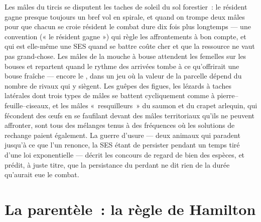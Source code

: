 \begin{example}\label{ex:b3:behavioural-ecology:games}
Les mâles du tircis se disputent les taches de soleil du sol
forestier~: le résident gagne presque toujours un bref vol en spirale,
et quand on trompe deux mâles pour que chacun se croie résident le
combat dure dix fois plus longtemps --- une convention (« le résident
gagne ») qui règle les affrontements à bon compte, et qui est elle-même
une SES quand se battre coûte cher et que la ressource ne vaut pas
grand-chose. Les mâles de la mouche à bouse attendent les femelles sur
les bouses et repartent quand le rythme des arrivées tombe à ce
qu'offrirait une bouse fraîche --- encore le , dans un jeu où la valeur de la parcelle dépend du nombre de
rivaux qui y siègent. Les guêpes des figues, les lézards à taches
latérales dont trois types de mâles se battent cycliquement comme à
pierre--feuille--ciseaux, et les mâles «~resquilleurs~» du saumon et du
crapet arlequin, qui fécondent des œufs en se faufilant devant des mâles
territoriaux qu'ils ne peuvent affronter, sont tous des mélanges tenus à
des fréquences où les solutions de rechange paient également. La guerre
d'usure --- deux animaux qui paradent jusqu'à ce que l'un renonce, la
SES étant de persister pendant un temps tiré d'une loi exponentielle ---
décrit les concours de regard de bien des espèces, et prédit, à juste
titre, que la persistance du perdant ne dit rien de la durée qu'aurait
eue le combat.
\end{example}

\section{La parentèle~: la règle de Hamilton}

